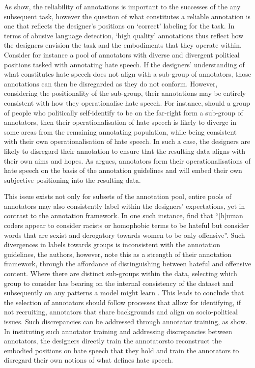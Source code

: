 As \citet{Hovy:2013} show, the reliability of annotations is important to the successes of the any subsequent task, however the question of what constitutes a reliable annotation is one that reflects the designer's positions on `correct' labeling for the task. In terms of abusive language detection, `high quality' annotations thus reflect how the designers envision the task and the embodiments that they operate within. Consider for instance a pool of annotators with diverse and divergent political positions tasked with annotating hate speech. If the designers' understanding of what constitutes hate speech does not align with a sub-group of annotators, those annotations can then be disregarded as they do not conform. However, considering the positionality of the sub-group, their annotations may be entirely consistent with how they operationalise hate speech. For instance, should a group of people who politically self-identify to be on the far-right form a sub-group of annotators, then their operationalisation of hate speech is likely to diverge in some areas from the remaining annotating population, while being consistent with their own operationalisation of hate speech. In such a case, the designers are likely to disregard their annotation to ensure that the resulting data aligns with their own aims and hopes. As \citet{Waseem:2016} argues, annotators form their operationalisations of hate speech on the basis of the annotation guidelines and will embed their own subjective positioning into the resulting data.

This issue exists not only for subsets of the annotation pool, entire pools of annotators may also consistently label within the designers' expectations, yet in contrast to the annotation framework. In one such instance, \citet{Davidson:2017} find that ``[h]uman coders appear to consider racists or homophobic terms to be hateful but consider words that are sexist and derogatory towards women to be only offensive''. Such divergences in labels towards groups is inconsistent with the annotation guidelines, the authors, however, note this as a strength of their annotation framework, through the affordance of distinguishing between hateful and offensive content.
Where there are distinct sub-groups within the data, selecting which group to consider has bearing on the internal consistency of the dataset and subsequently on any patterns a model might learn \citep{Waseem:2016}. This leads \citep{Waseem:2016} to conclude that the selection of annotators should follow processes that allow for identifying, if not recruiting, annotators that share backgrounds and align on socio-political issues.
Such discrepancies can be addressed through annotator training, as \citet{Vidgen:2020} show. In instituting such annotator training and addressing discrepancies between annotators, the designers directly train the annotatorsto reconstruct the embodied positions on hate speech that they hold and train the annotators to disregard their own notions of what defines hate speech.

